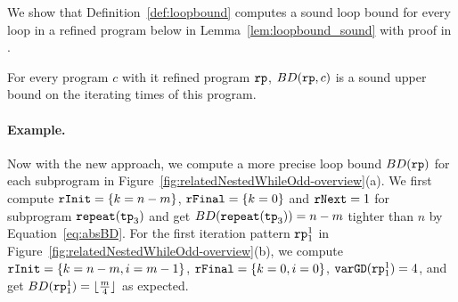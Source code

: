 \begin{defn}
\end{defn}
  We show that Definition~\ref{def:loopbound} computes a sound loop bound for every loop in a refined program below in Lemma~\ref{lem:loopbound_sound} with proof in .
\begin{lem}
  \label{lem:loopbound_sound}
  For every program $c$ with it refined program $\mathtt{rp}$,
  $BD(\mathtt{rp}, c)$ is a sound upper bound on the iterating times of this program.
\end{lem}

\paragraph{Example.}
Now with the new approach, we compute a more precise loop bound $BD(\mathtt{rp})$ for each subprogram in Figure~\ref{fig:relatedNestedWhileOdd-overview}(a). We first compute $\mathtt{rInit} = \{k = n - m\}$, $\mathtt{rFinal} = \{k = 0\}$ and $\mathtt{rNext} = 1$ for subprogram $\mathtt{repeat}(\mathtt{tp}_3)$ and get $BD(\mathtt{repeat}(\mathtt{tp}_3)) = n - m$ tighter than $n$ by Equation~\ref{eq:absBD}.
For the first iteration pattern $\mathtt{rp}_1^1$ in Figure~\ref{fig:relatedNestedWhileOdd-overview}(b), we compute 
$\mathtt{rInit} = \{k = n - m, i = m - 1\}$, $\mathtt{rFinal} = \{k = 0, i = 0\}$, $\mathtt{varGD}(\mathtt{rp}_1^1) = 4$, and get $BD(\mathtt{rp}_1^1) = \lfloor \frac{m}{4} \rfloor $ as expected.



